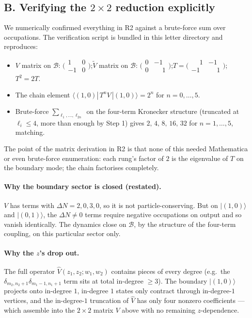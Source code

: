 \documentclass[11pt,a4paper]{article}
\begin{document}
\subsection{B. Verifying the $2{\times}2$ reduction explicitly}

We numerically confirmed everything in R2 against a brute-force sum over occupations. The verification script is bundled in this letter directory and reproduces:
\begin{itemize}[leftmargin=2em,itemsep=1pt,topsep=2pt]
\item $V$ matrix on $\mathcal{B}$: $\bigl(\begin{smallmatrix}1&0\\-1&0\end{smallmatrix}\bigr)$;\quad $\widetilde V$ matrix on $\mathcal{B}$: $\bigl(\begin{smallmatrix}0&-1\\0&\phantom{-}1\end{smallmatrix}\bigr)$;\quad $T = \bigl(\begin{smallmatrix}\phantom{-}1&-1\\-1&\phantom{-}1\end{smallmatrix}\bigr)$;\quad $T^2 = 2T$.
\item The chain element $\langle(1,0)|\,T^n V\,|(1,0)\rangle = 2^n$ for $n=0,\ldots,5$.
\item Brute-force $\sum_{\ell_1,\ldots,\ell_{2n}}$ on the four-term Kronecker structure (truncated at $\ell_i\le 4$, more than enough by Step 1) gives $2,\,4,\,8,\,16,\,32$ for $n=1,\ldots,5$, matching.
\end{itemize}
The point of the matrix derivation in R2 is that none of this needed Mathematica or even brute-force enumeration: each rung's factor of $2$ is the eigenvalue of $T$ on the boundary mode; the chain factorises completely.

\paragraph{Why the boundary sector is closed (restated).} $V$ has terms with $\Delta N = 2,0,3,0$, so it is not particle-conserving. But on $|(1,0)\rangle$ and $|(0,1)\rangle$, the $\Delta N\ne 0$ terms require negative occupations on output and so vanish identically. The dynamics close on $\mathcal{B}$, by the structure of the four-term coupling, on this particular sector only.

\paragraph{Why the $z$'s drop out.} The full operator $\widehat V(z_1,z_2;w_1,w_2)$ contains pieces of every degree (e.g.\ the $\delta_{m_2,n_2{+}1}\delta_{m_1{-}1,n_1{+}1}$ term sits at total in-degree $\ge 3$). The boundary $|(1,0)\rangle$ projects onto in-degree $1$, in-degree $1$ states only contract through in-degree-$1$ vertices, and the in-degree-$1$ truncation of $\widehat V$ has only four nonzero coefficients --- which assemble into the $2{\times}2$ matrix $V$ above with no remaining $z$-dependence.
\end{document}
